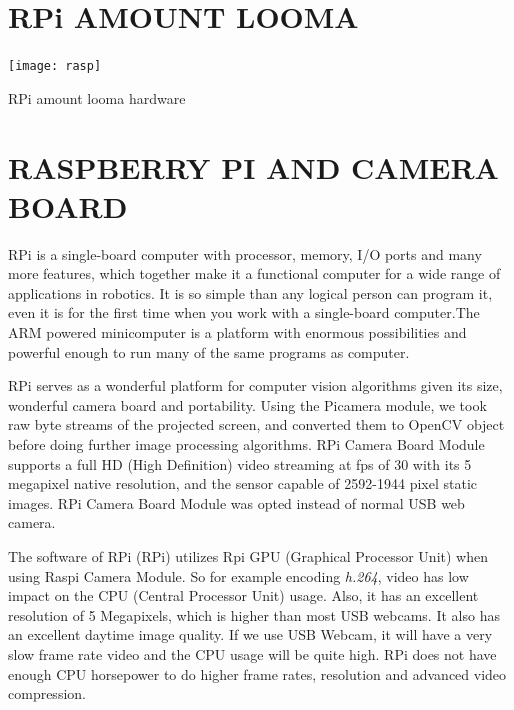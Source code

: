 \documentclass[12pt, a4paper]{article}
\begin{document}
\begin{appendices}
\newpage

\section{RPi AMOUNT LOOMA}
\begin{appendixfig}
\centering
\texttt{[image: rasp]}
\caption{RPi amount looma hardware}
\label{}
\end{appendixfig}
\newpage
\section{RASPBERRY PI AND CAMERA BOARD}
RPi is a single-board computer with processor, memory, I/O ports and many more features, which together make it a functional computer for a wide range of applications in robotics. It is so simple than any logical person can program it, even it is for the first time when you work with a single-board computer.The ARM powered minicomputer is a platform with enormous possibilities and powerful enough to run many of the same programs as computer. 

RPi serves as a wonderful platform for computer vision algorithms given its size, wonderful camera board and portability. Using the Picamera module, we took raw byte streams of the projected screen, and converted them to OpenCV object before doing further image processing algorithms. RPi Camera Board Module supports a full HD (High Definition) video streaming at fps of 30 with its 5 megapixel native resolution, and the sensor capable of 2592-1944 pixel static images. RPi Camera Board Module was opted instead of normal USB web camera.

The software of RPi (RPi) utilizes Rpi GPU (Graphical Processor Unit) when using Raspi Camera Module. So for example encoding \emph {h.264}, video has low impact on the CPU (Central Processor Unit) usage. Also, it has an excellent resolution of 5 Megapixels, which is higher than most USB webcams. It also has an excellent daytime image quality. If we use USB Webcam, it will have a very slow frame rate video and the CPU usage will be quite high. RPi does not have enough CPU horsepower to do higher frame rates, resolution and advanced video compression. 
\newpage

\end{appendices}
\end{document}
